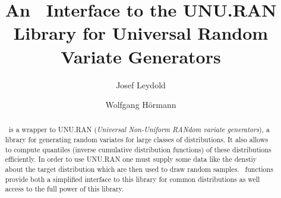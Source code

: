 
\subject{{\Huge\Runuran}}

\title{%
  An \R\ Interface to the UNU.RAN Library
  for Universal Random Variate Generators}

\author{Josef Leydold \and Wolfgang H\"ormann}

\publishers{%
  Department of Statistics and Mathematics, WU Wien, Austria\\
  Department for Industrial Engineering,
  Bo\u{g}azi\c{c}i University, Istanbul, Turkey
}


\maketitle


\begin{abstract}
  \noindent
  \Runuran\ is a wrapper to UNU.RAN (\emph{Universal
    Non-Uniform RANdom variate generators}), a library for generating
  random variates for large classes of distributions. It also allows
  to compute quantiles (inverse cumulative distribution 
  functions) of these distributions efficiently. 
  In order to use UNU.RAN one must supply some data like the denstiy 
  about the target distribution which are then used to draw random samples.
  \Runuran\ functions provide both a simplified interface to this
  library for common distributions as well access to the full power of
  this library.
\end{abstract}

